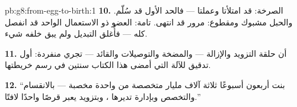 \begin{solution}{pb:g8:from-egg-to-birth:1}
\textbf{10.} الصرخة:  قد امتلأتا وعملتا ---
فالحد الأول قد سُلّم. والحبل مشبوك ومقطوع: مرور 
قد انتهى.  تامة: العضو ذو الاستعمال الواحد قد
انفصل كله --- فأُغلق التبديل ولم يبق خلفه شيء.

\textbf{11.} أن حلقة التزويد والإزالة --- 
والمضخة والتوصيلات والقائد --- تجري منفردة: أول تدقيق
للآلة التي أمضى هذا الكتاب سنتين في رسم خريطتها.

\textbf{12.} ``بنت أربعون أسبوعًا ثلاثة آلاف مليار 
متخصصة من  واحدة مخصبة --- بالانقسام والتخصص
وبإدارة تديرها ، وبتزويد يعبر قرصًا واحدًا
لافتًا.''
\end{solution}
